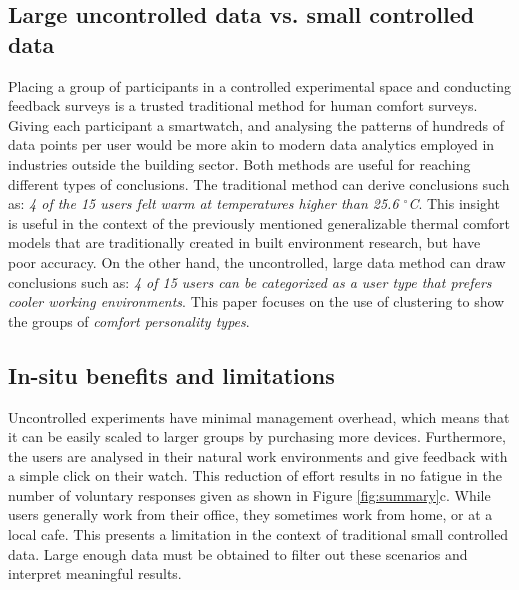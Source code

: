 
\subsection{Large uncontrolled data vs. small controlled data}



Placing a group of participants in a controlled experimental space and conducting feedback surveys is a trusted traditional method for human comfort surveys. Giving each participant a smartwatch, and analysing the patterns of hundreds of data points per user would be more akin to modern data analytics employed in industries outside the building sector. Both methods are useful for reaching different types of conclusions. The traditional method can derive conclusions such as: \emph{4 of the 15 users felt warm at temperatures higher than 25.6 $^\circ$C}. This insight is useful in the context of the previously mentioned generalizable thermal comfort models that are traditionally created in built environment research, but have poor accuracy. On the other hand, the uncontrolled, large data method can draw conclusions such as: \emph{4 of 15 users can be categorized as a user type that prefers cooler working environments}. This paper focuses on the use of clustering to show the groups of \emph{comfort personality types}.




\subsection{In-situ benefits and limitations}
Uncontrolled experiments have minimal management overhead, which means that it can be easily scaled to larger groups by purchasing more devices. Furthermore, the users are analysed in their natural work environments and give feedback with a simple click on their watch. This reduction of effort results in no fatigue in the number of voluntary responses given as shown in Figure \ref{fig:summary}c. While users generally work from their office, they sometimes work from home, or at a local cafe. This presents a limitation in the context of traditional small controlled data. Large enough data must be obtained to filter out these scenarios and interpret meaningful results.


